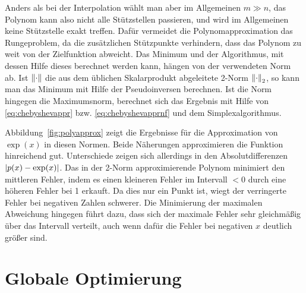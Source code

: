 Anders als bei der Interpolation wählt man aber im Allgemeinen $m\gg
n$, das Polynom kann also nicht alle Stützstellen passieren, und wird
im Allgemeinen keine Stützstelle exakt treffen. Dafür vermeidet die
Polynomapproximation das Rungeproblem, da die zusätzlichen Stützpunkte
verhindern, dass das Polynom zu weit von der Zielfunktion abweicht.
Das Minimum und der Algorithmus, mit dessen Hilfe dieses berechnet
werden kann, hängen von der verwendeten Norm ab. Ist $\left\lVert{\cdot}\right\rVert$
die aus dem üblichen Skalarprodukt abgeleitete 2-Norm $\left\lVert{\cdot}\right\rVert_2$,
so kann man das Minimum mit Hilfe der Pseudoinversen berechnen. Ist
die Norm hingegen die Maximumsnorm, berechnet sich das Ergebnis mit
Hilfe von \eqref{eq:chebyshevappr} bzw. \eqref{eq:chebyshevapprnf} und
dem Simplexalgorithmus.

Abbildung~\ref{fig:polyapprox} zeigt die Ergebnisse für die
Approximation von $\exp(x)$ in diesen Normen. Beide Näherungen
approximieren die Funktion hinreichend gut. Unterschiede zeigen sich
allerdings in den Absolutdifferenzen $\left\lvert{p(x) - \exp(x)}\right\rvert$. Das in der
2-Norm approximierende Polynom minimiert den mittleren Fehler, indem
es einen kleineren Fehler im Intervall $<0$ durch eine höheren Fehler
bei 1 erkauft. Da dies nur ein Punkt ist, wiegt der verringerte Fehler
bei negativen Zahlen schwerer. Die Minimierung der maximalen
Abweichung hingegen führt dazu, dass sich der maximale Fehler sehr
gleichmäßig über das Intervall verteilt, auch wenn dafür die Fehler bei
negativen $x$ deutlich größer sind.

\afterpage{\raggedbottom
   \clearpage }


\section{Globale Optimierung}

